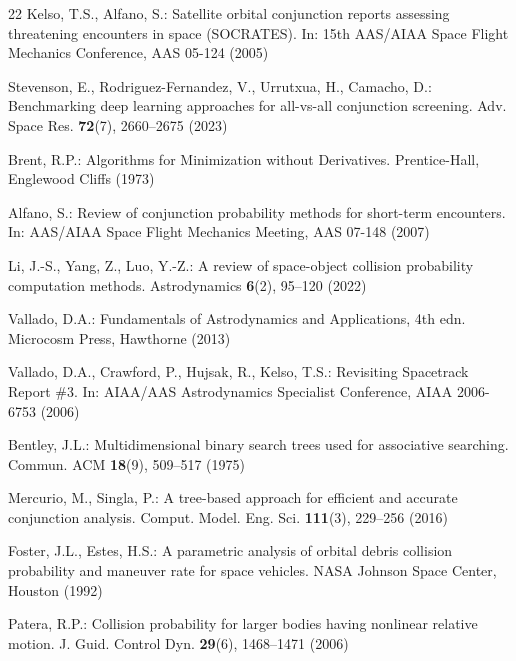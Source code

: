 \documentclass[runningheads]{llncs}
\begin{document}
\begin{thebibliography}{22}
 Kelso, T.S., Alfano, S.: Satellite orbital conjunction reports assessing threatening encounters in space (SOCRATES). In: 15th AAS/AIAA Space Flight Mechanics Conference, AAS 05-124 (2005)

 Stevenson, E., Rodriguez-Fernandez, V., Urrutxua, H., Camacho, D.: Benchmarking deep learning approaches for all-vs-all conjunction screening. Adv. Space Res. \textbf{72}(7), 2660--2675 (2023)

 Brent, R.P.: Algorithms for Minimization without Derivatives. Prentice-Hall, Englewood Cliffs (1973)

 Alfano, S.: Review of conjunction probability methods for short-term encounters. In: AAS/AIAA Space Flight Mechanics Meeting, AAS 07-148 (2007)

 Li, J.-S., Yang, Z., Luo, Y.-Z.: A review of space-object collision probability computation methods. Astrodynamics \textbf{6}(2), 95--120 (2022)

 Vallado, D.A.: Fundamentals of Astrodynamics and Applications, 4th edn. Microcosm Press, Hawthorne (2013)

 Vallado, D.A., Crawford, P., Hujsak, R., Kelso, T.S.: Revisiting Spacetrack Report \#3. In: AIAA/AAS Astrodynamics Specialist Conference, AIAA 2006-6753 (2006)

 Bentley, J.L.: Multidimensional binary search trees used for associative searching. Commun. ACM \textbf{18}(9), 509--517 (1975)

 Mercurio, M., Singla, P.: A tree-based approach for efficient and accurate conjunction analysis. Comput. Model. Eng. Sci. \textbf{111}(3), 229--256 (2016)

 Foster, J.L., Estes, H.S.: A parametric analysis of orbital debris collision probability and maneuver rate for space vehicles. NASA Johnson Space Center, Houston (1992)

 Patera, R.P.: Collision probability for larger bodies having nonlinear relative motion. J. Guid. Control Dyn. \textbf{29}(6), 1468--1471 (2006)

\end{thebibliography}
\end{document}
